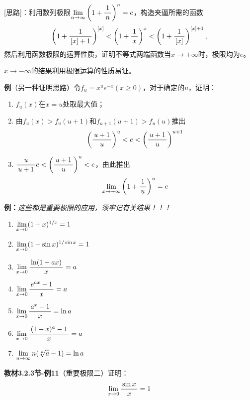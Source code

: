 [思路]：利用数列极限$\limn\left(1+\df1n\right)^n=e$，构造夹逼所需的函数
$$\left(1+\df1{[x]+1}\right)^{[x]}<\left(1+\df1x\right)^x
<\left(1+\df1{[x]}\right)^{[x]+1},$$
然后利用函数极限的运算性质，证明不等式两端函数当$x\to+\infty$时，极限均为$e$。

$x\to-\infty$的结果利用极限运算的性质易证。

\begin{shaded}
{\bf 例}（另一种证明思路）令$f_u=x^ue^{-x}(x\geq 0)$，对于确定的$u$，证明：
\begin{enumerate}[(1)]
  \setlength{\itemindent}{1cm}
  \item $f_u(x)$在$x=u$处取最大值；
  \item 由$f_u(x)>f_u(u+1)$和$f_{u+1}(u+1)>f_u(u)$推出
  $$\left(\df{u+1}u\right)^u<e<\left(\df{u+1}u\right)^{u+1}$$
  \item $\df u{u+1}e<\left(\df{u+1}u\right)^u<e$，由此推出
  $$\limx{+\infty}\left(1+\df 1u\right)^u=e$$
\end{enumerate}
\end{shaded}

{\b{\bf 例：}{\it 这些都是重要极限的应用，须牢记有关结果！！！}
\begin{enumerate}[(1)]
  \setlength{\itemindent}{1cm}
  \item $\limx{0}(1+x)^{1/x}=1$ 
  \item $\limx 0(1+\sin x)^{1/\sin x}=1$ 
  \item $\limx 0\df{\ln(1+ax)}{x}=a$
  \item $\limx 0\df{e^{ax}-1}{x}=a$ 
  \item $\limx 0\df{a^x-1}{x}=\ln a$ 
  \item $\limx 0\df{(1+x)^a-1}x=a$
  \item $\limn n(\sqrt[n]{a}-1)=\ln a$ 
\end{enumerate}}

{\bf 教材3.2.3节-例11}（重要极限二）证明：
$$\limx{0}\df {\sin x}x=1$$

